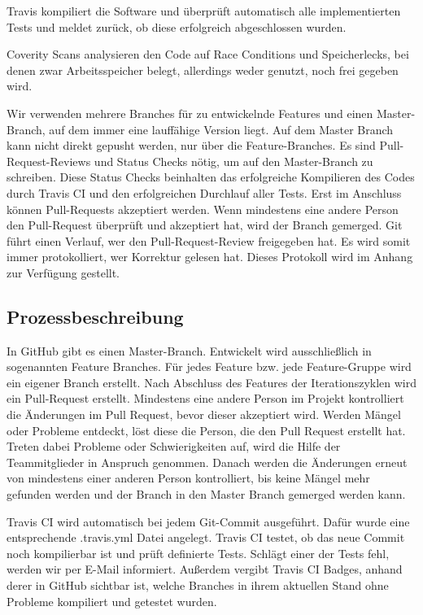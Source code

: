 \documentclass[accentcolor=tud0b,12pt,paper=a4]{tudreport}
\begin{document}
Travis kompiliert die Software und überprüft automatisch alle implementierten Tests und meldet zurück, ob diese erfolgreich abgeschlossen wurden. 

Coverity Scans analysieren den Code auf Race Conditions und Speicherlecks, bei denen zwar Arbeitsspeicher belegt, allerdings weder genutzt, noch frei gegeben wird. 

Wir verwenden mehrere Branches für zu entwickelnde Features und einen Master-Branch, auf dem immer eine lauffähige Version liegt. Auf dem Master Branch kann nicht direkt gepusht werden, nur über die Feature-Branches. Es sind Pull-Request-Reviews und Status Checks nötig, um auf den Master-Branch zu schreiben. Diese Status Checks beinhalten das erfolgreiche Kompilieren des Codes durch Travis CI und den erfolgreichen Durchlauf aller Tests. Erst im Anschluss können Pull-Requests akzeptiert werden. Wenn mindestens eine andere Person den Pull-Request überprüft und akzeptiert hat, wird der Branch gemerged. Git führt einen Verlauf, wer den Pull-Request-Review freigegeben hat. Es wird somit immer protokolliert, wer Korrektur gelesen hat. Dieses Protokoll wird im Anhang zur Verfügung gestellt.


	\subsection{Prozessbeschreibung}
In GitHub gibt es einen Master-Branch. Entwickelt wird ausschließlich in sogenannten Feature Branches. Für jedes Feature bzw. jede Feature-Gruppe wird ein eigener Branch erstellt. Nach Abschluss des Features der Iterationszyklen wird ein Pull-Request erstellt. Mindestens eine andere Person im Projekt kontrolliert die Änderungen im Pull Request, bevor dieser akzeptiert wird. Werden Mängel oder Probleme entdeckt, löst diese die Person, die den Pull Request erstellt hat. Treten dabei Probleme oder Schwierigkeiten auf, wird die Hilfe der Teammitglieder in Anspruch genommen. Danach werden die Änderungen erneut von mindestens einer anderen Person kontrolliert, bis keine Mängel mehr gefunden werden und der Branch in den Master Branch gemerged werden kann. 

Travis CI wird automatisch bei jedem Git-Commit ausgeführt. Dafür wurde eine entsprechende .travis.yml Datei angelegt. Travis CI testet, ob das neue Commit noch kompilierbar ist und prüft definierte Tests. Schlägt einer der Tests fehl, werden wir per E-Mail informiert. Außerdem vergibt Travis CI Badges, anhand derer in GitHub sichtbar ist, welche Branches in ihrem aktuellen Stand ohne Probleme kompiliert und getestet wurden. 
\end{document}

